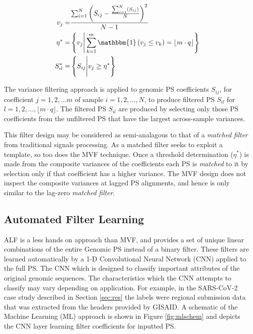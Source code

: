 \documentclass[10pt,conference]{IEEEtran}
\begin{document}
\begin{align} 
\label{eq:var}
\begin{split}
v_j =& \frac{\sum_{i=1}^N\left(S_{ij}-\frac{\sum_{i=1}^N(S_{ij})}{N}\right)^2 }{N-1} \\
\eta^* =& \left\{ v_j \Bigg\vert \sum_{k=1}^m \mathbbm{1}\left( v_j \leq v_k \right) = \lfloor m\cdot q\rfloor \right\}\\
S^*_{il} =& \left\{ S_{ij} \Bigg\vert v_j \geq \eta^* \right\}
\end{split}
\end{align}


The variance filtering approach is applied to genomic PS coefficients  $S_{ij}$, for coefficient $j = 1,2,\dots m$ of sample $i = 1,2,\dots,N$, to produce filtered PS $S_{il}$ for $l = 1,2,\dots,\lfloor m \cdot q \rfloor$. The filtered PS $S_{il}$ are produced by selecting only those PS coefficients from the unfiltered PS that have the largest across-sample variances. 

This filter design may be considered as semi-analagous to that of a \textit{matched filter} from 
traditional signals processing.  
As a matched filter seeks to exploit a template, so too does the MVF technique. 
Once a threshold determination ($\eta^*$) is made from the composite variances of the coefficients 
each PS is \textit{matched} to it by selection only if that coefficient has a higher variance.  
The MVF design does not inspect the composite variances at lagged PS alignments, and hence is only similar to the lag-zero \textit{matched filter}. 

\subsection{Automated Filter Learning} 

\noindent ALF is a less hands on approach than MVF, and provides a set of unique linear combinations of the entire Genomic PS instead of a binary filter. 
These filters are learned automatically by a 1-D Convolutional Neural Network (CNN) applied 
to the full PS. The CNN which is designed to classify important attributes of the original genomic 
sequences. 
The characteristics which the CNN attempts to classify may vary depending on application. For example, in the SARS-CoV-2 case study described in Section \ref{sec:res} the labels were regional submission 
data that was extracted from the headers provided by GISAID. 
A schematic of the Machine Learning (ML) approach is shown in Figure \ref{fig:mlschem} and depicts the CNN layer learning filter coefficients for inputted PS.
\end{document}
